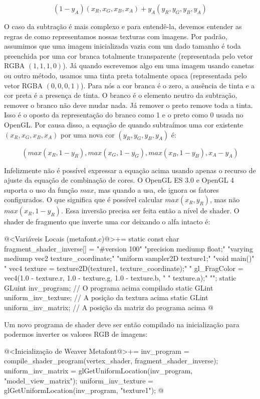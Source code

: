 {$$(1-y_A)(x_R, x_G, x_B, x_A) + y_A(y_R, y_G, y_B, y_A)$$

O caso da subtração é mais complexo e para entendê-la, devemos
entender as regras de como representamos nossas texturas com
imagens. Por padrão, assumimos que uma imagem inicializada vazia com
um dado tamanho é toda preenchida por uma cor branca totalmente
transparente (representada pelo vetor RGBA $(1, 1, 1, 0)$). Já quando
escrevemos algo em uma imagem usando canetas ou outro método, usamos
uma tinta preta totalmente opaca (representada pelo vetor RGBA $(0, 0,
0, 1)$). Para nós a cor branca é o zero, a ausência de tinta e a cor
preta é a presença de tinta. O branco é o elemento neutro da
subtração, remover o branco não deve mudar nada. Já remover o preto
remove toda a tinta. Isso é o oposto da representação do branco como 1
e o preto como 0 usada no OpenGL. Por causa disso, a equação de quando
subtraímos uma cor existente $(x_R, x_G, x_B, x_A)$ por uma nova cor
$(y_R, y_G, y_B, y_A)$ é:

$$
(max(x_R, 1-y_R), max(x_G, 1-y_G), max(x_B, 1-y_B), x_A-y_A)
$$

Infelizmente não é possível expressar a equação acima usando apenas o
recurso de ajuste da equação de combinação de cores. O OpenGL ES 3.0 e
OpenGL 4 suporta o uso da função $max$, mas quando a usa, ele ignora
os fatores configurados. O que significa que é possível calcular
$max(x_R, y_R)$, mas não $max(x_R, 1- y_R)$. Essa inversão precisa ser
feita então a nível de shader. O shader de fragmento que inverte uma
cor deixando o alfa intacto é:

\iniciocodigo
@<Variáveis Locais (metafont.c)@>+=
static const char fragment_shader_inverse[] =
  "#version 100\n"
  "precision mediump float;\n"
  "varying mediump vec2 texture_coordinate;\n"
  "uniform sampler2D texture1;\n"
  "void main(){\n"
  "  vec4 texture = texture2D(texture1, texture_coordinate);\n"
  "  gl_FragColor = vec4(1.0 - texture.r, 1.0 - texture.g, 1.0 - texture.b, \n"
  "                      texture.a);\n"
  "}\n";
static GLuint inv_program; // O programa acima compilado
static GLint uniform_inv_texture; // A posição da textura acima
static GLint uniform_inv_matrix; // A posição da matriz do programa acima
@
\fimcodigo

Um novo programa de shader deve ser então compilado na inicialização
para podermos inverter os valores RGB de imagens:

\iniciocodigo
@<Inicialização de Weaver Metafont@>+=
{
  inv_program = compile_shader_program(vertex_shader, fragment_shader_inverse);
  uniform_inv_matrix = glGetUniformLocation(inv_program, "model_view_matrix");
  uniform_inv_texture = glGetUniformLocation(inv_program, "texture1");
}
@
\fimcodigo

}

